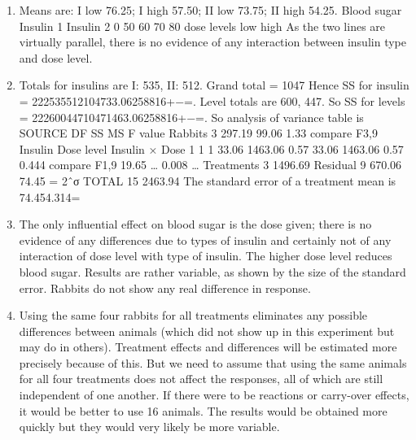 \documentclass[a4paper,12pt]{article}
\begin{document}
\begin{enumerate}
\item Means are: I low 76.25; I high 57.50; II low 73.75; II high 54.25.
Blood
sugar
Insulin 1
Insulin 2
0
50
60
70
80
dose levels
low
high
As the two lines are virtually parallel, there is no evidence of any interaction between insulin type and dose level.
\item Totals for insulins are I: 535, II: 512. Grand total = 1047
Hence SS for insulin = 222535512104733.06258816+−=.
Level totals are 600, 447. So SS for levels = 22260044710471463.06258816+−=.
So analysis of variance table is
SOURCE
DF
SS
MS
F value
Rabbits
3
297.19
99.06
1.33 compare F3,9
Insulin
Dose level
Insulin × Dose
1
1
1
33.06
1463.06
0.57
33.06
1463.06
0.57
0.444 compare F1,9
19.65 …
0.008 …
Treatments
3
1496.69
Residual
9
670.06
74.45
= 2ˆσ
TOTAL
15
2463.94
The standard error of a treatment mean is 74.454.314=
\item The only influential effect on blood sugar is the dose given; there is no evidence of any differences due to types of insulin and certainly not of any interaction of dose level with type of insulin. The higher dose level reduces blood sugar. Results are rather variable, as shown by the size of the standard error. Rabbits do not show any real difference in response.
\item Using the same four rabbits for all treatments eliminates any possible differences between animals (which did not show up in this experiment but may do in others). Treatment effects and differences will be estimated more precisely because of this. But we need to assume that using the same animals for all four treatments does not affect the responses, all of which are still independent of one another. If there were to be reactions or carry-over effects, it would be better to use 16 animals. The results would be obtained more quickly but they would very likely be more variable.
\end{enumerate}
\end{document}
